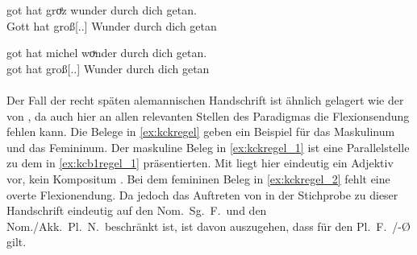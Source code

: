 \begin{exe}
\ex \label{ex:kcc1akkpln0}
	\begin{xlist}
	\ex \label{ex:kcc1akkpln0_1}
		\gll got hat groͤz wunder durch dich getan. \\
			Gott hat groß[\Acc.\Pl.\NeutI] Wunder durch dich getan \\
		\begin{taggedline}{\parencites%
			[\pno~72\ra, 38]{kc:C1}[vgl.]%
			[\pno~82\rb, 35]{kc:K}%
			[\pno~279\ra, 17]{kc:Z}%
			[13778]{schroeder1895}%
		}
		\trans {}
		\end{taggedline}

	\ex \label{ex:kcc1akkpln0_2}
		\gll got hat michel woͮnder durch dich getan. \\
			 got hat groß[\Acc.\Pl.\NeutI] Wunder durch dich getan \\
		\begin{taggedline}{\parencites%
			[\pno~59\va, 14]{kc:A1}[vgl.]%
			[\pno~105\rb, 21]{kc:M}%
			[\pno~83\vb, 28]{kc:H}%
			[\pno~36a\vc, 24]{kc:B1}%
			[\pno~93\vb, 32]{kc:VB}%
			[13778]{schroeder1895}%
		}
		\trans {}
		\end{taggedline}
	\end{xlist}
\end{exe}

\paragraph{\citet{kc:K}}
Der Fall der recht späten alemannischen Handschrift \citet{kc:K} ist ähnlich
gelagert wie der von \citet{kc:C1}, da auch hier an allen relevanten Stellen
des Paradigmas die Flexionsendung fehlen kann. Die Belege in \cref{ex:kckregel}
geben ein Beispiel für das Maskulinum und das Femininum. Der maskuline Beleg in
\cref{ex:kckregel_1} ist eine Parallelstelle zu dem in \cref{ex:kcb1regel_1}
präsentierten. Mit   liegt hier eindeutig ein Adjektiv
vor, kein Kompositum  
\autocite[vgl.][\pno~\textit{althêrre}]{mwb1}. Bei dem femininen Beleg in
\cref{ex:kckregel_2} fehlt eine overte Flexionendung.
Da jedoch das Auftreten von  in der Stichprobe zu dieser Handschrift
eindeutig auf den Nom.\ Sg.\ F.\ und den Nom./Akk.\ Pl.\ N.\ beschränkt ist,
ist davon auszugehen, dass für den Pl.~F.\ /-Ø gilt.

